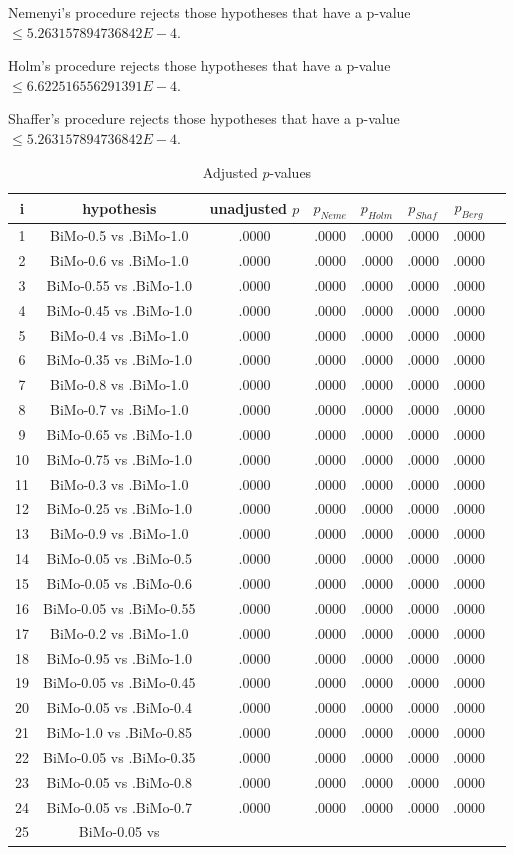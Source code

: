 \documentclass[a4paper,10pt]{article}
\begin{document}
\begin{landscape}
\begin{table}[!htp]
\begin{tabular}{cccccc}
\end{tabular}
\end{table}
Nemenyi's procedure rejects those hypotheses that have a p-value $\le5.263157894736842E-4$.


Holm's procedure rejects those hypotheses that have a p-value $\le6.622516556291391E-4$.


Shaffer's procedure rejects those hypotheses that have a p-value $\le5.263157894736842E-4$.


\begin{table}[!htp]
\centering\tiny
\caption{Adjusted $p$-values}
\begin{tabular}{cccccccc}
i&hypothesis&unadjusted $p$&$p_{Neme}$&$p_{Holm}$&$p_{Shaf}$&$p_{Berg}$\\
\hline
1&BiMo-0.5 vs .BiMo-1.0&.0000&.0000&.0000&.0000&.0000\\2&BiMo-0.6 vs .BiMo-1.0&.0000&.0000&.0000&.0000&.0000\\3&BiMo-0.55 vs .BiMo-1.0&.0000&.0000&.0000&.0000&.0000\\4&BiMo-0.45 vs .BiMo-1.0&.0000&.0000&.0000&.0000&.0000\\5&BiMo-0.4 vs .BiMo-1.0&.0000&.0000&.0000&.0000&.0000\\6&BiMo-0.35 vs .BiMo-1.0&.0000&.0000&.0000&.0000&.0000\\7&BiMo-0.8 vs .BiMo-1.0&.0000&.0000&.0000&.0000&.0000\\8&BiMo-0.7 vs .BiMo-1.0&.0000&.0000&.0000&.0000&.0000\\9&BiMo-0.65 vs .BiMo-1.0&.0000&.0000&.0000&.0000&.0000\\10&BiMo-0.75 vs .BiMo-1.0&.0000&.0000&.0000&.0000&.0000\\11&BiMo-0.3 vs .BiMo-1.0&.0000&.0000&.0000&.0000&.0000\\12&BiMo-0.25 vs .BiMo-1.0&.0000&.0000&.0000&.0000&.0000\\13&BiMo-0.9 vs .BiMo-1.0&.0000&.0000&.0000&.0000&.0000\\14&BiMo-0.05 vs .BiMo-0.5&.0000&.0000&.0000&.0000&.0000\\15&BiMo-0.05 vs .BiMo-0.6&.0000&.0000&.0000&.0000&.0000\\16&BiMo-0.05 vs .BiMo-0.55&.0000&.0000&.0000&.0000&.0000\\17&BiMo-0.2 vs .BiMo-1.0&.0000&.0000&.0000&.0000&.0000\\18&BiMo-0.95 vs .BiMo-1.0&.0000&.0000&.0000&.0000&.0000\\19&BiMo-0.05 vs .BiMo-0.45&.0000&.0000&.0000&.0000&.0000\\20&BiMo-0.05 vs .BiMo-0.4&.0000&.0000&.0000&.0000&.0000\\21&BiMo-1.0 vs .BiMo-0.85&.0000&.0000&.0000&.0000&.0000\\22&BiMo-0.05 vs .BiMo-0.35&.0000&.0000&.0000&.0000&.0000\\23&BiMo-0.05 vs .BiMo-0.8&.0000&.0000&.0000&.0000&.0000\\24&BiMo-0.05 vs .BiMo-0.7&.0000&.0000&.0000&.0000&.0000\\25&BiMo-0.05 vs 
\end{tabular}
\end{table}
\end{landscape}
\end{document}
